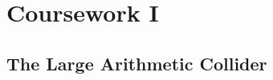 
\newcommand{\deadlineOneTime}{noon}
\newcommand{\deadlineOneDate}{16 February 2021}
\newcommand{\submissionOneURL}{https://tabula.warwick.ac.uk/coursework/submission/43213a10-18dc-4e87-8364-c648097af402}
\newcommand{\classroomOneURL}{https://classroom.github.com/a/eQTilEdh}



\cleardoublepage
\chapter{Coursework I}

\section{The Large Arithmetic Collider}

